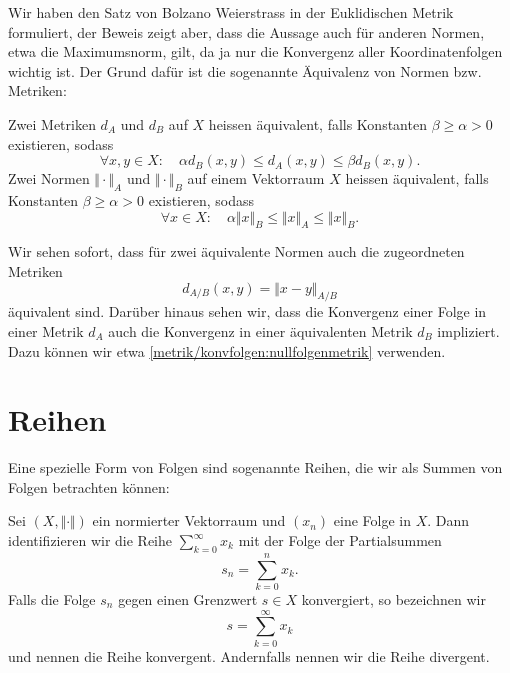 \documentclass[letterpaper,10pt,english]{jupyterBook}
\begin{document}
Wir haben den Satz von Bolzano Weierstrass in der Euklidischen Metrik formuliert, der Beweis zeigt aber, dass die Aussage auch für anderen Normen, etwa die Maximumsnorm, gilt, da ja nur die Konvergenz aller Koordinatenfolgen wichtig ist. Der Grund dafür ist die sogenannte Äquivalenz von Normen bzw. Metriken:
\label{metrik/teilfolgen:definition-6}
\begin{definition}{}{}



Zwei Metriken \(d_A\) und \(d_B\) auf \(X\) heissen äquivalent, falls Konstanten \(\beta \geq \alpha > 0\) existieren, sodass
\begin{equation*}
\forall x,y \in X: \quad \alpha  d_B(x,y) \leq d_A(x,y) \leq \beta d_B(x,y) .
\end{equation*}
Zwei Normen \(\Vert \cdot \Vert_A\) und \(\Vert \cdot \Vert_B\) auf einem Vektorraum \(X\) heissen äquivalent, falls Konstanten \(\beta \geq \alpha > 0\) existieren, sodass
\begin{equation*}
\forall x  \in X: \quad \alpha  \Vert x \Vert_B  \leq \Vert x \Vert_A  \leq \Vert x \Vert_B  .
\end{equation*}\end{definition}

Wir sehen sofort, dass für zwei äquivalente Normen auch die zugeordneten Metriken
\begin{equation*}
 d_{A/B}(x,y) = \Vert x -y \Vert_{A/B}
\end{equation*}
äquivalent sind.
Darüber hinaus sehen wir, dass die Konvergenz einer Folge in einer Metrik \(d_A\) auch die Konvergenz in einer äquivalenten Metrik \(d_B\) impliziert. Dazu können wir etwa \cref{metrik/konvfolgen:nullfolgenmetrik} verwenden.


\section{Reihen}
\label{\detokenize{metrik/reihen:reihen}}\label{\detokenize{metrik/reihen::doc}}
Eine spezielle Form von Folgen sind sogenannte Reihen, die wir als Summen von Folgen betrachten können:
\label{metrik/reihen:definition-0}
\begin{definition}{}{}



Sei \((X,\Vert \cdot \Vert)\) ein normierter Vektorraum und \((x_n)\) eine Folge in \(X\). Dann identifizieren wir die Reihe \(\sum_{k=0}^\infty x_k\) mit der Folge der Partialsummen
\begin{equation*}
 s_n = \sum_{k=0}^n x_k.
\end{equation*}
Falls die Folge \(s_n\) gegen einen Grenzwert \(s \in  X\) konvergiert, so bezeichnen wir
\begin{equation*}
 s = \sum_{k=0}^\infty x_k
\end{equation*}
und nennen die Reihe konvergent. Andernfalls nennen wir die Reihe divergent.
\end{definition}
\end{document}
